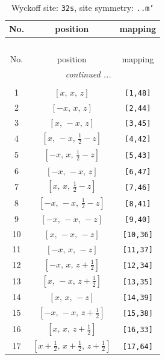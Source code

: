 \documentclass[fleqn,8pt]{jsarticle}
\begin{document}
\begin{longtable}{ccc}
\caption{Wyckoff site: {\tt 32s}, site symmetry: {\tt ..m'}}
 \\
 \hline \hline
No. & position & mapping \\ \hline \endfirsthead

\multicolumn{2}{l}{\tablename\ \thetable{}} \\
 \hline \hline
No. & position & mapping \\ \hline \endhead

 \hline \hline
\multicolumn{2}{r}{\footnotesize\it continued ...} \\ \endfoot

 \hline \hline
\multicolumn{2}{r}{} \\ \endlastfoot

1 & $\left[ x,\, x,\, z \right]$ & {\tt [1,48]} \\ \hline
2 & $\left[ - x,\, x,\, z \right]$ & {\tt [2,44]} \\ \hline
3 & $\left[ x,\, - x,\, z \right]$ & {\tt [3,45]} \\ \hline
4 & $\left[ x,\, - x,\, \frac{1}{2} - z \right]$ & {\tt [4,42]} \\ \hline
5 & $\left[ - x,\, x,\, \frac{1}{2} - z \right]$ & {\tt [5,43]} \\ \hline
6 & $\left[ - x,\, - x,\, z \right]$ & {\tt [6,47]} \\ \hline
7 & $\left[ x,\, x,\, \frac{1}{2} - z \right]$ & {\tt [7,46]} \\ \hline
8 & $\left[ - x,\, - x,\, \frac{1}{2} - z \right]$ & {\tt [8,41]} \\ \hline
9 & $\left[ - x,\, - x,\, - z \right]$ & {\tt [9,40]} \\ \hline
10 & $\left[ x,\, - x,\, - z \right]$ & {\tt [10,36]} \\ \hline
11 & $\left[ - x,\, x,\, - z \right]$ & {\tt [11,37]} \\ \hline
12 & $\left[ - x,\, x,\, z + \frac{1}{2} \right]$ & {\tt [12,34]} \\ \hline
13 & $\left[ x,\, - x,\, z + \frac{1}{2} \right]$ & {\tt [13,35]} \\ \hline
14 & $\left[ x,\, x,\, - z \right]$ & {\tt [14,39]} \\ \hline
15 & $\left[ - x,\, - x,\, z + \frac{1}{2} \right]$ & {\tt [15,38]} \\ \hline
16 & $\left[ x,\, x,\, z + \frac{1}{2} \right]$ & {\tt [16,33]} \\ \hline
17 & $\left[ x + \frac{1}{2},\, x + \frac{1}{2},\, z + \frac{1}{2} \right]$ & {\tt [17,64]} \\ \hline

\end{longtable}
\end{document}
